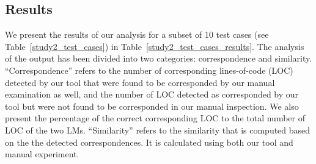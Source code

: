
\subsection{Results}  \label{study2-results}
We present the results of our analysis for a subset of 10 test cases (see Table~\ref{study2_test_cases}) in Table~\ref{study2_test_cases_results}. The analysis of the output has been divided into two categories: correspondence and similarity. ``Correspondence'' refers to the number of corresponding lines-of-code (LOC) detected by our tool that were found to be corresponded by our manual examination as well, and the number of LOC detected as corresponded by our tool but were not found to be corresponded in our manual inspection. We also present the percentage of the correct corresponding LOC to the total number of LOC of the two LMs. ``Similarity'' refers to the similarity that is computed based on the the detected correspondences. It is calculated using both our tool and manual experiment.



